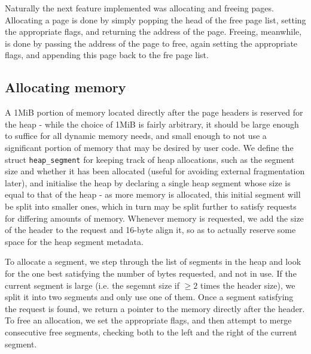 \documentclass[10pt,a4paper]{article}
\newcommand{\code}[1]{\texttt{#1}}
\begin{document}
Naturally the next feature implemented was allocating and freeing pages.
Allocating a page is done by simply popping the head of the free page list,
setting the appropriate flags, and returning the address of the page. Freeing,
meanwhile, is done by passing the address of the page to free, again setting the
appropriate flags, and appending this page back to the fre page list.

\subsection{Allocating memory}
A 1MiB portion of memory located directly after the page headers is reserved for
the heap - while the choice of 1MiB is fairly arbitrary, it should be large
enough to suffice for all dynamic memory needs, and small enough to not use a
significant portion of memory that may be desired by user code. We define the
struct \code{heap\_segment} for keeping track of heap allocations, such as the
segment size and whether it has been allocated (useful for avoiding external
fragmentation later), and initialise the heap by declaring a single heap segment
whose size is equal to that of the heap - as more memory is allocated, this
initial segment will be split into smaller ones, which in turn may be split
further to satisfy requests for differing amounts of memory. Whenever memory is
requested, we add the size of the header to the request and 16-byte align it, so
as to actually reserve some space for the heap segment metadata.

To allocate a segment, we step through the list of segments in the heap and look
for the one best satisfying the number of bytes requested, and not in use. If
the current segment is large (i.e. the segemnt size if $\ge2$ times the header
size), we split it into two segments and only use one of them. Once a segment
satisfying the request is found, we return a pointer to the memory directly
after the header. To free an allocation, we set the appropriate flags, and then
attempt to merge consecutive free segments, checking both to the left and the
right of the current segment.
\end{document}

